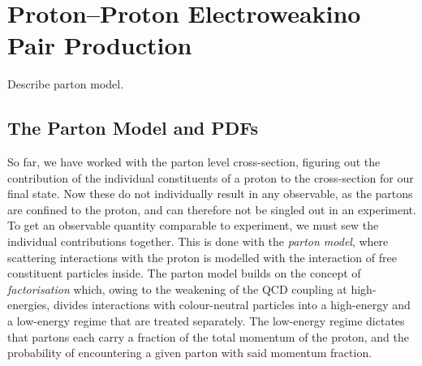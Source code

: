 \documentclass[../main.tex]{subfiles}
\begin{document}
\chapter{Proton--Proton Electroweakino Pair Production}

\begin{TODO}
  \item Describe parton model.
\end{TODO}

\section{The Parton Model and PDFs}
So far, we have worked with the parton level cross-section, figuring out the contribution of the individual constituents of a proton to the cross-section for our final state.
Now these do not individually result in any observable, as the partons are confined to the proton, and can therefore not be singled out in an experiment.
To get an observable quantity comparable to experiment, we must sew the individual contributions together.
This is done with the \emph{parton model}, where scattering interactions with the proton is modelled with the interaction of free constituent particles inside.
The parton model builds on the concept of \emph{factorisation} which, owing to the weakening of the QCD coupling at high-energies, divides interactions with colour-neutral particles into a high-energy and a low-energy regime that are treated separately.
The low-energy regime dictates that partons each carry a fraction of the total momentum of the proton, and the probability of encountering a given parton with said momentum fraction.
\end{document}
